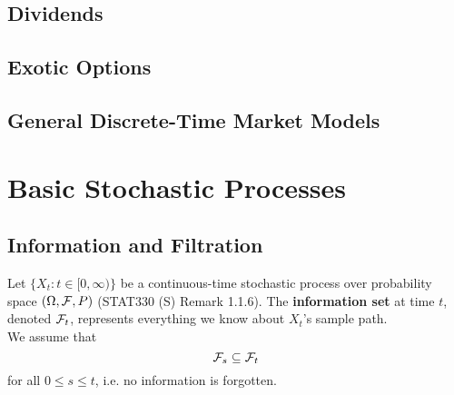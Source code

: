 \documentclass[11pt,fleqn]{book} %
\begin{document}

\section{Dividends}


\section{Exotic Options}


\section{General Discrete-Time Market Models}



\chapter{Basic Stochastic Processes}


\section{Information and Filtration}

\begin{definition} \label{def:311}
Let \(\{X_t: t \in [0, \infty)\}\) be a continuous-time stochastic process over probability space \((\Omega, \mathcal{F}, P)\) (STAT330 (S) Remark 1.1.6). The \textbf{information set} at time \(t\), denoted \(\mathcal{F}_t\), represents everything we know about \(X_t\)'s sample path. \\
\indent We assume that
\[
\mathcal{F}_s \subseteq \mathcal{F}_t
\]
for all \(0 \leq s \leq t\), i.e. no information is forgotten.
\end{definition}
\end{document}
